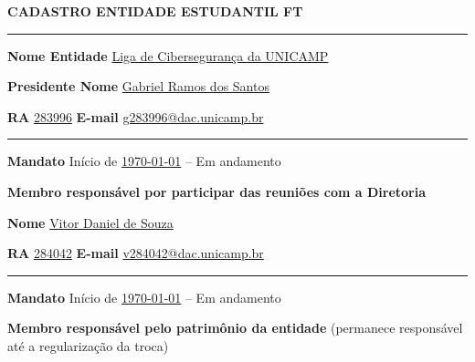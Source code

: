 \documentclass[10pt, a4paper]{article}
\begin{document}
\small

\begin{center}
    \large\textbf{CADASTRO ENTIDADE ESTUDANTIL FT}
\end{center}

\vspace{0.2cm}
\hrule
\vspace{0.5cm}

\textbf{Nome Entidade} \hspace{1cm} \underline{Liga de Cibersegurança da UNICAMP}

\vspace{0.3cm}
\textbf{Presidente Nome} \hspace{0.75cm} \underline{Gabriel Ramos dos Santos}

\vspace{0.3cm}
\textbf{RA} \hspace{0.5cm} \underline{283996}
\hspace{0.5cm}
\textbf{E-mail} \hspace{0.5cm} \underline{g283996@dac.unicamp.br}

\vspace{0.5cm}
\hrule
\vspace{0.5cm}

\textbf{Mandato} Início de \underline \today{} -- Em andamento

\vspace{0.3cm}
\textbf{Membro responsável por participar das reuniões com a Diretoria}

\vspace{0.1cm}

\textbf{Nome} \hspace{0.75cm} \underline{Vitor Daniel de Souza}

\vspace{0.3cm}
\textbf{RA} \hspace{0.5cm} \underline{284042}
\hspace{0.5cm}
\textbf{E-mail} \hspace{0.5cm} \underline{v284042@dac.unicamp.br}

\vspace{0.5cm}
\hrule
\vspace{0.5cm}

\textbf{Mandato} Início de \underline{\today}{} -- Em andamento

\vspace{0.3cm}
\textbf{Membro responsável pelo patrimônio da entidade} {\scriptsize(permanece responsável até a regularização da troca)}
\end{document}
